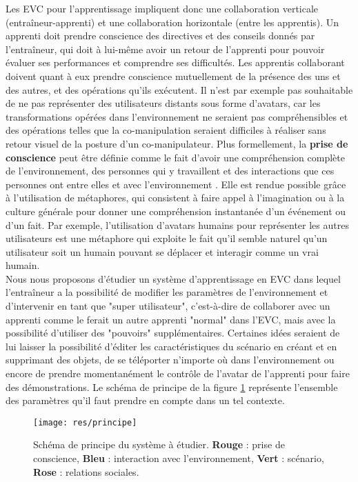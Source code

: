 \documentclass[11pt]{article}
\begin{document}
Les EVC pour l'apprentissage impliquent donc une collaboration verticale (entraîneur-apprenti) et une collaboration horizontale (entre les apprentis). Un apprenti doit prendre conscience des directives et des conseils donnés par l'entraîneur, qui doit à lui-même avoir un retour de l'apprenti pour pouvoir évaluer ses performances et comprendre ses difficultés. Les apprentis collaborant doivent quant à eux prendre conscience mutuellement de la présence des uns et des autres, et des opérations qu'ils exécutent. Il n'est par exemple pas souhaitable de ne pas représenter des utilisateurs distants sous forme d'avatars, car les transformations opérées dans l'environnement ne seraient pas compréhensibles et des opérations telles que la co-manipulation seraient difficiles à réaliser sans retour visuel de la posture d'un co-manipulateur. Plus formellement, la \textbf{prise de conscience} peut être définie comme le fait d'avoir une compréhension complète de l'environnement, des personnes qui y travaillent et des interactions que ces personnes ont entre elles et avec l'environnement \cite{survey}. Elle est rendue possible grâce à l'utilisation de métaphores, qui consistent à faire appel à l'imagination ou à la culture générale pour donner une compréhension instantanée d'un événement ou d'un fait. Par exemple, l'utilisation d'avatars humains pour représenter les autres utilisateurs est une métaphore qui exploite le fait qu'il semble naturel qu'un utilisateur soit un humain pouvant se déplacer et interagir comme un vrai humain.
\\

Nous nous proposons d'étudier un système d'apprentissage en EVC dans lequel l'entraîneur a la possibilité de modifier les paramètres de l'environnement et d'intervenir en tant que "super utilisateur", c'est-à-dire de collaborer avec un apprenti comme le ferait un autre apprenti "normal" dans l'EVC, mais avec la possibilité d'utiliser des "pouvoirs" supplémentaires. Certaines idées seraient de lui laisser la possibilité d'éditer les caractéristiques du scénario en créant et en supprimant des objets, de se téléporter n'importe où dans l'environnement ou encore de prendre momentanément le contrôle de l'avatar de l'apprenti pour faire des démonstrations. Le schéma de principe de la figure \ref{fig:principle} représente l'ensemble des paramètres qu'il faut prendre en compte dans un tel contexte.
\\

\begin{figure}[!h]
\centering
\texttt{[image: res/principe]}
\caption{\label{fig:principle}Schéma de principe du système à étudier. \textbf{Rouge} : prise de conscience, \textbf{Bleu} : interaction avec l'environnement, \textbf{Vert} : scénario, \textbf{Rose} : relations sociales.}
\end{figure}
\end{document}
